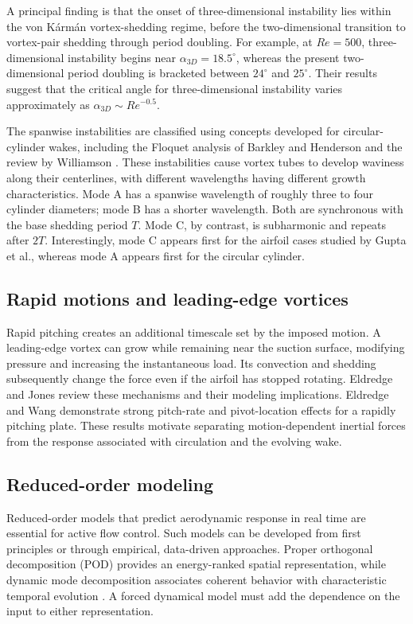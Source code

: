
A principal finding is that the onset of three-dimensional instability lies within the von K\'arm\'an vortex-shedding regime, before the two-dimensional transition to vortex-pair shedding through period doubling. For example, at $Re=500$, three-dimensional instability begins near $\alpha_{3D}=18.5^\circ$, whereas the present two-dimensional period doubling is bracketed between $24^\circ$ and $25^\circ$.
 Their results suggest that the critical angle for three-dimensional instability varies approximately as $\alpha_{3D}\sim Re^{-0.5}$.

The spanwise instabilities are classified using concepts developed for circular-cylinder wakes, including the Floquet analysis of Barkley and Henderson \cite{barkley} and the review by Williamson \cite{williamson}. These instabilities cause vortex tubes to develop waviness along their centerlines, with different wavelengths having different growth characteristics. Mode A has a spanwise wavelength of roughly three to four cylinder diameters; mode B has a shorter wavelength. Both are synchronous with the base shedding period $T$. Mode C, by contrast, is subharmonic and repeats after $2T$. Interestingly, mode C appears first for the airfoil cases studied by Gupta et al., whereas mode A appears first for the circular cylinder.

\subsection{Rapid motions and leading-edge vortices}
Rapid pitching creates an additional timescale set by the imposed motion. A leading-edge vortex can grow while remaining near the suction surface, modifying pressure and increasing the instantaneous load. Its convection and shedding subsequently change the force even if the airfoil has stopped rotating. Eldredge and Jones \cite{eldredge2019} review these mechanisms and their modeling implications. Eldredge and Wang \cite{eldredge2010} demonstrate strong pitch-rate and pivot-location effects for a rapidly pitching plate. These results motivate separating motion-dependent inertial forces from the response associated with circulation and the evolving wake.

\subsection{Reduced-order modeling}
Reduced-order models that predict aerodynamic response in real time are essential for active flow control. Such models can be developed from first principles or through empirical, data-driven approaches. Proper orthogonal decomposition (POD) provides an energy-ranked spatial representation, while dynamic mode decomposition associates coherent behavior with characteristic temporal evolution \cite{bruntonbook,mlfluids}. A forced dynamical model must add the dependence on the input to either representation.

